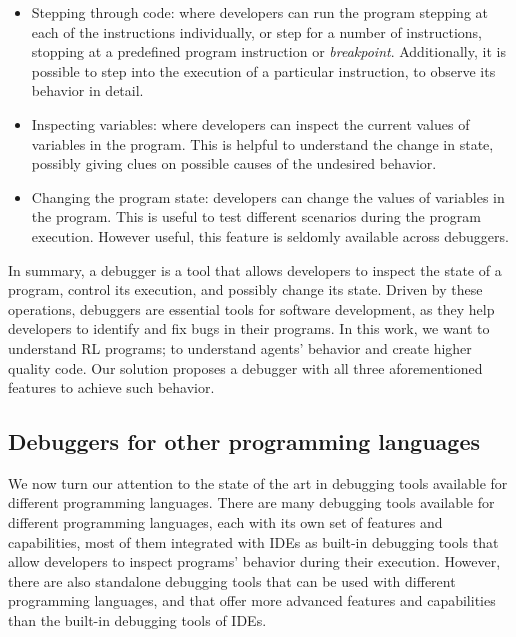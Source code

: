\begin{itemize}
    \item Stepping through code: where developers can run the program stepping at each of the 
    instructions individually, or step for a number of instructions, stopping at a predefined program 
    instruction or  \emph{breakpoint}. Additionally, it is possible to step into the execution of a particular 
    instruction, to observe its behavior in detail. 
    \item Inspecting variables: where developers can inspect the current values of variables in the 
    program. This is helpful to understand the change in state, possibly giving clues on possible causes 
    of the undesired behavior.
    \item Changing the program state: developers can change the values of variables in the program. 
    This is useful to test different scenarios during the program execution. However useful, this feature 
    is seldomly available across debuggers.
\end{itemize}

In summary, a debugger is a tool that allows developers to inspect the state of a program, control 
its execution, and possibly change its state. Driven by these operations, debuggers are essential 
tools for software development, as they help developers to identify and fix bugs in their programs. 
In this work, we want to understand \ac{RL} programs; to understand agents' behavior and 
create higher quality code. Our solution proposes a debugger with all three aforementioned features
to achieve such behavior.


\subsection{Debuggers for other programming languages}
\label{sec:other}

We now turn our attention to the state of the art in debugging tools available for different 
programming languages. There are many debugging tools available for different programming 
languages, each with its own set of features and capabilities, most of them integrated with IDEs as
built-in debugging tools that allow developers to inspect programs' behavior during their execution. 
However, there are also standalone debugging tools that can be used with different 
programming languages, and that offer more advanced features and capabilities than the 
built-in debugging tools of IDEs. 

